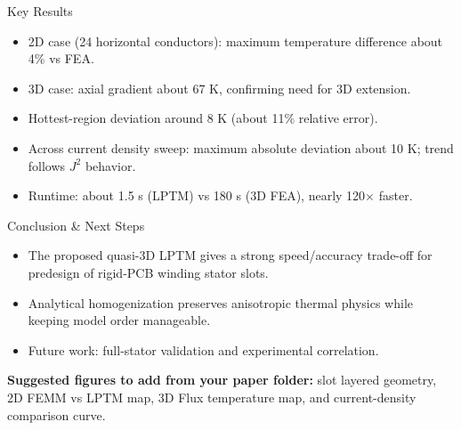 \documentclass[a0paper,portrait]{baposter}
\newcommand{\alert}[1]{{\color{brandBlue}#1}}
\begin{document}
\begin{poster}
\begin{posterbox}[name=results,column=2,below=validation]{Key Results}
\begin{itemize}
  \item 2D case (24 horizontal conductors): maximum temperature difference about \alert{4\%} vs FEA.
  \item 3D case: axial gradient about \alert{67 K}, confirming need for 3D extension.
  \item Hottest-region deviation around \alert{8 K} (about 11\% relative error).
  \item Across current density sweep: maximum absolute deviation about \alert{10 K}; trend follows $J^2$ behavior.
  \item Runtime: about \alert{1.5 s} (LPTM) vs \alert{180 s} (3D FEA), nearly 120$\times$ faster.
\end{itemize}
\end{posterbox}

\begin{posterbox}[name=conclusion,column=0,span=3,below=contrib,above=bottom]{Conclusion \& Next Steps}
\begin{itemize}
  \item The proposed quasi-3D LPTM gives a strong speed/accuracy trade-off for predesign of rigid-PCB winding stator slots.
  \item Analytical homogenization preserves anisotropic thermal physics while keeping model order manageable.
  \item Future work: full-stator validation and experimental correlation.
\end{itemize}
\vspace{0.3em}
\textbf{Suggested figures to add from your paper folder:} slot layered geometry, 2D FEMM vs LPTM map, 3D Flux temperature map, and current-density comparison curve.
\end{posterbox}

\end{poster}
\end{document}
